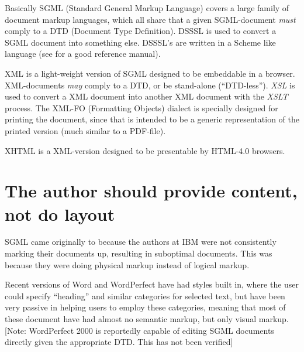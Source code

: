 Basically SGML (Standard General Markup Language) covers a large
family of document markup languages, which all share that a given
SGML-document \textit{must} comply to a DTD (Document Type
Definition).  DSSSL is used to convert a SGML document into something
else.  DSSSL's are written in a Scheme like language (see
\cite{Dybvig:1996:SPL} for a good reference manual).

XML is a light-weight version of SGML designed to be embeddable in a
browser.  XML-documents \textit{may} comply to a DTD, or be
stand-alone (``DTD-less'').  \textit{XSL} is used to convert a XML document
into another XML document with the \textit{XSLT} process.  The XML-FO
(Formatting Objects) dialect is specially designed for printing the
document, since that is intended to be a generic representation of the
printed version (much similar to a PDF-file).

XHTML is a XML-version designed to be presentable by HTML-4.0
browsers.

\section{The author should provide content, not do layout}

SGML came originally to because the authors at IBM were not
consistently marking their documents up, resulting in suboptimal
documents.  This was because they were doing physical markup instead
of logical markup.

  
Recent versions of Word and WordPerfect have had styles built in,
where the user could specify ``heading'' and similar categories for
selected text, but have been very passive in helping users to employ
these categories, meaning that most of these document have had almost
no semantic markup, but only visual markup.  [Note: WordPerfect 2000
is reportedly capable of editing SGML documents directly given the
appropriate DTD.  This has not been verified]

